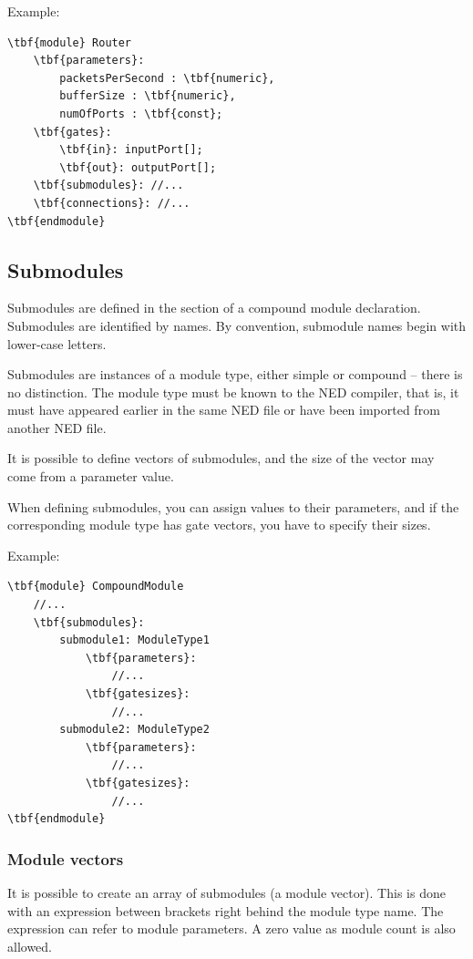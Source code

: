 Example:

\begin{Verbatim}[commandchars=\\\{\}]
\tbf{module} Router
    \tbf{parameters}:
        packetsPerSecond : \tbf{numeric},
        bufferSize : \tbf{numeric},
        numOfPorts : \tbf{const};
    \tbf{gates}:
        \tbf{in}: inputPort[];
        \tbf{out}: outputPort[];
    \tbf{submodules}: //...
    \tbf{connections}: //...
\tbf{endmodule}
\end{Verbatim}


\subsection{Submodules}

Submodules are defined in the
 section of a compound
module declaration. Submodules are identified by names.
By convention, submodule names begin with lower-case letters.

Submodules are instances of a module type, either simple
or compound -- there is no distinction. The module type
must be known to the NED compiler, that is, it must have appeared
earlier in the same NED file or have been imported from another
NED file.

It is possible to define vectors of submodules, and the
size of the vector may come from a parameter value.

When defining submodules, you can assign values to their
parameters, and if the corresponding module type has gate vectors,
you have to specify their sizes.


Example:

\begin{Verbatim}[commandchars=\\\{\}]
\tbf{module} CompoundModule
    //...
    \tbf{submodules}:
        submodule1: ModuleType1
            \tbf{parameters}:
                //...
            \tbf{gatesizes}:
                //...
        submodule2: ModuleType2
            \tbf{parameters}:
                //...
            \tbf{gatesizes}:
                //...
\tbf{endmodule}
\end{Verbatim}


\subsubsection{Module vectors}


It is possible to create an array of
submodules (a module
vector).  This is done with an expression between
brackets right behind the module type name. The expression can refer
to module parameters. A zero value as module count is also allowed.


